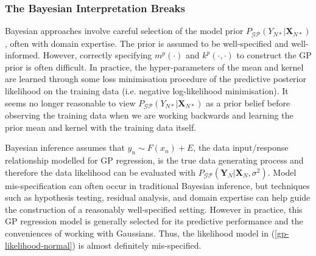 \documentclass{article}
\newcommand{\GP}{\operatorname{\mathcal{GP}}}
\numberwithin{equation}{section}
\begin{document}
\subsubsection{The Bayesian Interpretation Breaks}
Bayesian approaches involve careful selection of the model prior $P_{\GP}(Y_{N*}\vert \mathbf{X}_{N*})$, often with domain expertise. The prior is assumed to be well-specified and well-informed. However, correctly specifying $m^p(\cdot)$ and $k^p(\cdot, \cdot)$ to construct the GP prior is often difficult. In practice, the hyper-parameters of the mean and kernel are learned through some loss minimisation procedure of the predictive posterior likelihood on the training data (i.e. negative log-likelihood minimisation).
It seems no longer reasonable to view $P_{\GP}(Y_{N*}\vert \mathbf{X}_{N*})$ as a prior belief before observing the training data when we are working backwards and learning the prior mean and kernel with the training data itself.

 Bayesian inference assumes that $y_n \sim F(x_n) + E$, the data input/response relationship modelled for GP regression, is the true data generating process and therefore the data likelihood can be evaluated with $P_{\GP}\left(\mathbf{Y}_N \vert \mathbf{X}_N, \sigma^2\right)$. Model mis-specification can often occur in traditional Bayesian inference, but techniques such as hypothesis testing, residual analysis, and domain expertise can help guide the construction of a reasonably well-specified setting. However in practice, this GP regression model is generally selected for its predictive performance and the conveniences of working with Gaussians. Thus, the likelihood model in (\ref{gp-likelihood-normal}) is almost definitely mis-specified. 
 
\end{document}
